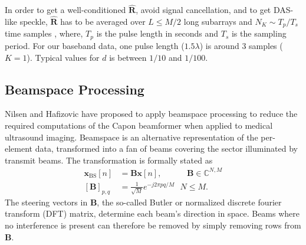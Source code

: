 \documentclass[journal]{IEEEtran}
\newcommand{\mat}[1]{\mathbf{#1}}
\renewcommand{\vec}[1]{\mathbf{#1}}
\begin{document}
In order to get a well-conditioned $\mat{\hat{R}}$, avoid signal cancellation, and to get DAS-like speckle, $\mat{\hat{R}}$ has to be averaged over $L\le M/2$ long subarrays and $N_K \sim T_p/T_s$ time samples \cite{Synnevag2007a}, where, $T_p$ is the pulse length in seconds and $T_s$ is the sampling period. For our baseband data, one pulse length ($1.5\lambda$) is around 3 samples ($K=1$). Typical values for $d$ is between $1/10$ and $1/100$.




\subsection{Beamspace Processing}\label{bs-capon}
Nilsen and Hafizovic \cite{Nilsen2009} have proposed to apply beamspace processing to reduce the required computations of the Capon beamformer when applied to medical ultrasound imaging. Beamspace is an alternative representation of the per-element data, transformed into a fan of beams covering the sector illuminated by transmit beams. The transformation is formally stated as
\begin{align}
\vec{x}_\text{BS}[n] &= \mat{B}\vec{x}[n], \ \ \ \ \ \ \ \ \ \ \ \ \ \, \mat{B} \in \mathbb{C}^{N,M} \label{eq:butler} \\ 
[\mat{B}]_{p,q} &= \frac{1}{\sqrt{M}}e^{-j 2 \pi p q / M} \ \ \ N \le M.
\end{align} 
The steering vectors in $\mat{B}$, the so-called Butler or normalized discrete fourier transform (DFT) matrix, determine each beam's direction in space. Beams where no interference is present can therefore be removed by simply removing rows from $\mat{B}$. 
\end{document}
